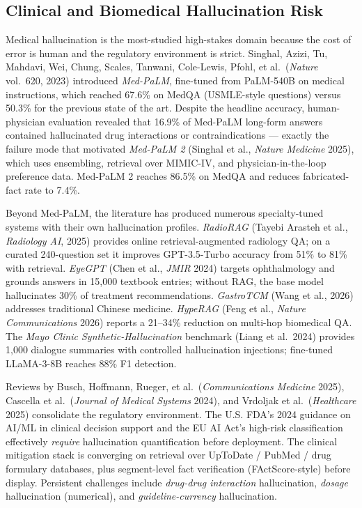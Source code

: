 \subsection{Clinical and Biomedical Hallucination Risk}\label{clinical-and-biomedical-hallucination-risk}

Medical hallucination is the most-studied high-stakes domain because the cost of error is human and the regulatory environment is strict. Singhal, Azizi, Tu, Mahdavi, Wei, Chung, Scales, Tanwani, Cole-Lewis, Pfohl, et al.~(\emph{Nature} vol.~620, 2023) introduced \emph{Med-PaLM}, fine-tuned from PaLM-540B on medical instructions, which reached 67.6\% on MedQA (USMLE-style questions) versus 50.3\% for the previous state of the art. Despite the headline accuracy, human-physician evaluation revealed that 16.9\% of Med-PaLM long-form answers contained hallucinated drug interactions or contraindications --- exactly the failure mode that motivated \emph{Med-PaLM 2} (Singhal et al., \emph{Nature Medicine} 2025), which uses ensembling, retrieval over MIMIC-IV, and physician-in-the-loop preference data. Med-PaLM 2 reaches 86.5\% on MedQA and reduces fabricated-fact rate to 7.4\%.

Beyond Med-PaLM, the literature has produced numerous specialty-tuned systems with their own hallucination profiles. \emph{RadioRAG} (Tayebi Arasteh et al., \emph{Radiology AI}, 2025) provides online retrieval-augmented radiology QA; on a curated 240-question set it improves GPT-3.5-Turbo accuracy from 51\% to 81\% with retrieval. \emph{EyeGPT} (Chen et al., \emph{JMIR} 2024) targets ophthalmology and grounds answers in 15,000 textbook entries; without RAG, the base model hallucinates 30\% of treatment recommendations. \emph{GastroTCM} (Wang et al., 2026) addresses traditional Chinese medicine. \emph{HypeRAG} (Feng et al., \emph{Nature Communications} 2026) reports a 21--34\% reduction on multi-hop biomedical QA. The \emph{Mayo Clinic Synthetic-Hallucination} benchmark (Liang et al.~2024) provides 1,000 dialogue summaries with controlled hallucination injections; fine-tuned LLaMA-3-8B reaches 88\% F1 detection.

Reviews by Busch, Hoffmann, Rueger, et al.~(\emph{Communications Medicine} 2025), Cascella et al.~(\emph{Journal of Medical Systems} 2024), and Vrdoljak et al.~(\emph{Healthcare} 2025) consolidate the regulatory environment. The U.S. FDA's 2024 guidance on AI/ML in clinical decision support and the EU AI Act's high-risk classification effectively \emph{require} hallucination quantification before deployment. The clinical mitigation stack is converging on retrieval over UpToDate / PubMed / drug formulary databases, plus segment-level fact verification (FActScore-style) before display. Persistent challenges include \emph{drug-drug interaction} hallucination, \emph{dosage} hallucination (numerical), and \emph{guideline-currency} hallucination.

